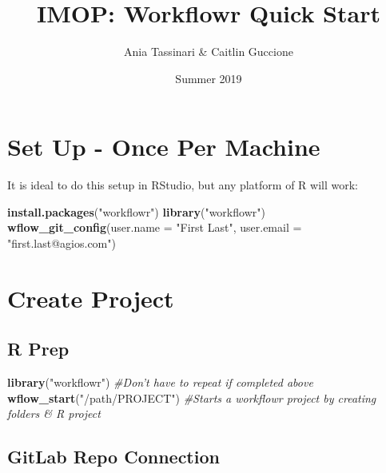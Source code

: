 \documentclass[openany]{article}
\title{IMOP: Workflowr Quick Start}
\author{Ania Tassinari \& Caitlin Guccione}
\date{Summer 2019}
\newenvironment{Shaded}{\begin{snugshade}}{\end{snugshade}}
\newcommand{\CommentTok}[1]{\textcolor[rgb]{0.56,0.35,0.01}{\textit{#1}}}
\newcommand{\DataTypeTok}[1]{\textcolor[rgb]{0.13,0.29,0.53}{#1}}
\newcommand{\KeywordTok}[1]{\textcolor[rgb]{0.13,0.29,0.53}{\textbf{#1}}}
\newcommand{\NormalTok}[1]{#1}
\newcommand{\StringTok}[1]{\textcolor[rgb]{0.31,0.60,0.02}{#1}}
\begin{document}
\maketitle

\hypertarget{set-up---once-per-machine}{%
\section{Set Up - Once Per Machine}\label{set-up---once-per-machine}}

It is ideal to do this setup in RStudio, but any platform of R will work:

\begin{Shaded}
\begin{Highlighting}[]
\KeywordTok{install.packages}\NormalTok{(}\StringTok{"workflowr"}\NormalTok{)}
\KeywordTok{library}\NormalTok{(}\StringTok{"workflowr"}\NormalTok{)}
\KeywordTok{wflow_git_config}\NormalTok{(}\DataTypeTok{user.name =} \StringTok{"First Last"}\NormalTok{, }\DataTypeTok{user.email =} \StringTok{"first.last@agios.com"}\NormalTok{)}
\end{Highlighting}
\end{Shaded}

\hypertarget{create-project}{%
\section{Create Project}\label{create-project}}

\hypertarget{r-prep}{%
\subsection{R Prep}\label{r-prep}}

\begin{Shaded}
\begin{Highlighting}[]
\KeywordTok{library}\NormalTok{(}\StringTok{"workflowr"}\NormalTok{) }\CommentTok{#Don't have to repeat if completed above}
\KeywordTok{wflow_start}\NormalTok{(}\StringTok{"/path/PROJECT"}\NormalTok{) }\CommentTok{#Starts a workflowr project by creating folders & R project}
\end{Highlighting}
\end{Shaded}

\hypertarget{gitlab-repo-connection}{%
\subsection{GitLab Repo Connection}\label{gitlab-repo-connection}}
\end{document}
